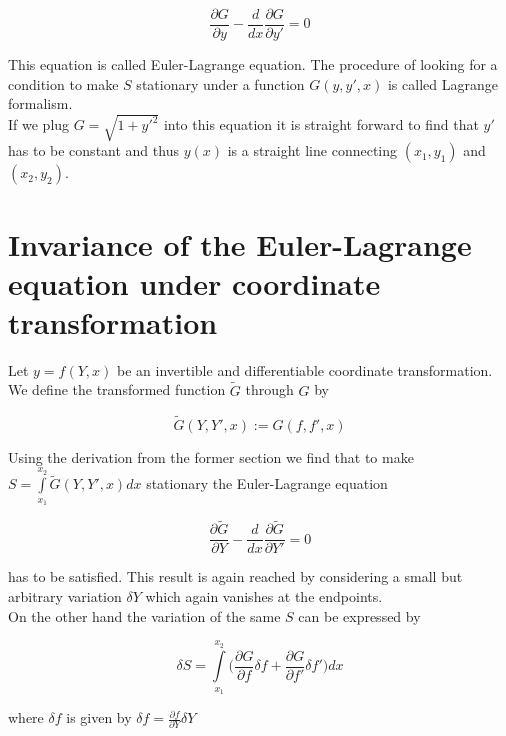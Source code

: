 \documentclass{article}
\begin{document}
\begin{equation}
\frac{\partial G}{\partial y} - \frac{d}{dx}\frac{\partial G}{\partial y'} = 0
\end{equation}

This equation is called Euler-Lagrange equation. The procedure of looking for a condition to make $S$ stationary under a function $G(y,y',x)$ is called Lagrange formalism.\\

If we plug $G = \sqrt{1+y'^2}$ into this equation it is straight forward to find that $y'$ has to be constant and thus $y(x)$ is a straight line connecting $(x_1,y_1)$ and $(x_2,y_2)$.

\section{Invariance of the Euler-Lagrange equation under coordinate transformation \cite{Kleinert}}

Let $y=f(Y,x)$ be an invertible and differentiable coordinate transformation. We define the transformed function $\widetilde{G}$ through $G$ by

\begin{equation}
\widetilde{G}(Y,Y',x) := G(f,f',x)
\end{equation}

Using the derivation from the former section we find that to make $S = \int\limits_{x_1}^{x_2} \widetilde{G}(Y,Y',x) dx$ stationary the Euler-Lagrange equation

\begin{equation}
\frac{\partial \widetilde{G}}{\partial Y} 
- \frac{d}{dx}\frac{\partial \widetilde{G}}{\partial Y'} = 0
\end{equation}

has to be satisfied. This result is again reached by considering a small but arbitrary variation $\delta Y$ which again vanishes at the endpoints.\\

On the other hand the variation of the same $S$ can be expressed by

\begin{equation}
\delta S = \int\limits_{x_1}^{x_2} \bigg( \frac{\partial G}{\partial f} \delta f 
+ \frac{\partial G}{\partial f'} \delta f' \bigg) dx
\end{equation}

where $\delta f$ is given by $\delta f = \frac{\partial f}{\partial Y} \delta Y$ \\
\end{document}
